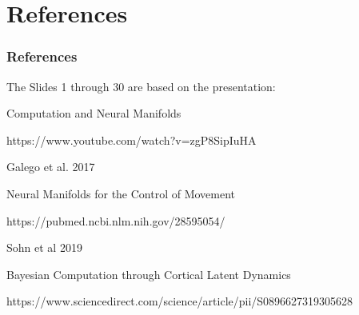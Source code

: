 \documentclass{beamer}
\begin{document}

\section{References}
\begin{frame}
\frametitle{References}

The Slides 1 through 30 are based on the presentation:

Computation and Neural Manifolds

https://www.youtube.com/watch?v=zgP8SipIuHA

Galego et al. 2017

Neural Manifolds for the Control of Movement

https://pubmed.ncbi.nlm.nih.gov/28595054/

Sohn et al 2019

Bayesian Computation through Cortical Latent Dynamics

https://www.sciencedirect.com/science/article/pii/S0896627319305628


\end{frame}



\end{document}
